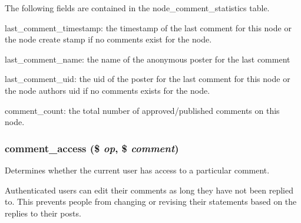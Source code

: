 The following fields are contained in the node\_\-comment\_\-statistics table.
\begin{DoxyItemize}
\item last\_\-comment\_\-timestamp: the timestamp of the last comment for this node or the node create stamp if no comments exist for the node.
\item last\_\-comment\_\-name: the name of the anonymous poster for the last comment
\item last\_\-comment\_\-uid: the uid of the poster for the last comment for this node or the node authors uid if no comments exists for the node.
\item comment\_\-count: the total number of approved/published comments on this node. 
\end{DoxyItemize}\hypertarget{comment_8module_a08e4627f1aaa3a4b06ec01b7c00a98e5}{
\subsubsection[{comment\_\-access}]{\setlength{\rightskip}{0pt plus 5cm}comment\_\-access (\$ {\em op}, \/  \$ {\em comment})}}
\label{comment_8module_a08e4627f1aaa3a4b06ec01b7c00a98e5}
Determines whether the current user has access to a particular comment.

Authenticated users can edit their comments as long they have not been replied to. This prevents people from changing or revising their statements based on the replies to their posts.


